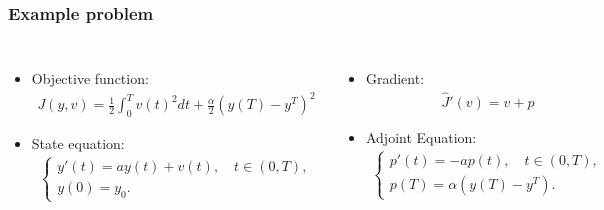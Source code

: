 \documentclass[9pt]{beamer}
\begin{document}
\begin{frame}
\frametitle{Example problem}
\begin{columns}
\begin{itemize}
\item<1->{Objective function:{\tiny\begin{align*}
J(y,v) = \frac{1}{2}\int_0^Tv(t)^2dt + \frac{\alpha}{2}(y(T)-y^T)^2 
\end{align*}
}%
}
\item<1->{State equation:{\tiny\begin{align*}
\left\{
     \begin{array}{lr}
       	y'(t)=ay(t) + v(t), \quad  t\in(0,T),\\
       	y(0)=y_0.
     \end{array}
   \right. 
\end{align*}
}%
}
\end{itemize}
\begin{itemize}
\item<1->{Gradient:{\tiny
\begin{align*}
\hat{J}'(v) = v+p
\end{align*}
}%
}
\item<1->{Adjoint Equation:{\tiny
\begin{align*}
\left\{
     \begin{array}{lr}
       	p'(t)=-ap(t), \quad  t\in(0,T),\\
       	p(T)=\alpha(y(T)-y^T).
     \end{array}
   \right. 
\end{align*}
}%
}
\end{itemize}
\end{columns}
\end{frame}
\end{document}
